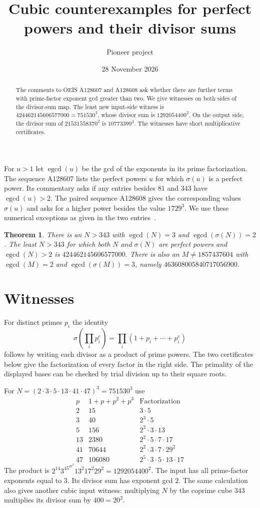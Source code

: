 \documentclass[11pt]{article}
\title{Cubic counterexamples for perfect powers and their divisor sums}
\author{Pioneer project}
\date{28 November 2026}
\newtheorem{theorem}{Theorem}
\newcommand{\egcd}{\operatorname{egcd}}
\begin{document}
\maketitle

\begin{abstract}
The comments to OEIS A128607 and A128608 ask whether there are further
terms with prime-factor exponent gcd greater than two. We give witnesses
on both sides of the divisor-sum map. The least new input-side witness is
$424462145606577000=751530^3$, whose divisor sum is $1292054400^2$.
On the output side, the divisor sum of $21531558370^2$ is
$10773399^3$. The witnesses have short multiplicative certificates.
\end{abstract}

For $u>1$ let $\egcd(u)$ be the gcd of the exponents in its prime
factorization. The sequence A128607 lists the perfect powers $u$ for which
$\sigma(u)$ is a perfect power. Its commentary asks if any entries besides
$81$ and $343$ have $\egcd(u)>2$. The paired sequence A128608 gives the
corresponding values $\sigma(u)$ and asks for a higher power besides the
value $1729^3$. We use these numerical exceptions as given in the two
entries~\cite{oeis607,oeis608}.

\begin{theorem}
There is an $N>343$ with $\egcd(N)=3$ and $\egcd(\sigma(N))=2$.
The least $N>343$ for which both $N$ and $\sigma(N)$ are perfect powers
and $\egcd(N)>2$ is $424462145606577000$.
There is also an $M\ne 1857437604$ with $\egcd(M)=2$ and
$\egcd(\sigma(M))=3$, namely $463608005840717056900$.
\end{theorem}

\section{Witnesses}

For distinct primes $p_i$ the identity
\[
 \sigma\left(\prod_i p_i^e\right)=
 \prod_i (1+p_i+\cdots+p_i^e)
\]
follows by writing each divisor as a product of prime powers. The two
certificates below give the factorization of every factor in the right
side. The primality of the displayed bases can be checked by trial division
up to their square roots.

For $N=(2\cdot 3\cdot 5\cdot 13\cdot 41\cdot 47)^3=751530^3$ use
\[
\begin{array}{r|r|l}
p & 1+p+p^2+p^3 & \text{Factorization}\\ \hline
2 & 15 & 3\cdot5\\
3 & 40 & 2^3\cdot5\\
5 & 156 & 2^2\cdot3\cdot13\\
13 & 2380 & 2^2\cdot5\cdot7\cdot17\\
41 & 70644 & 2^2\cdot3\cdot7\cdot29^2\\
47 & 106080 & 2^5\cdot3\cdot5\cdot13\cdot17
\end{array}
\]
The product is
$2^{14}3^45^47^2 13^2 17^2 29^2=1292054400^2$. The input has all
prime-factor exponents equal to $3$. Its divisor sum has exponent gcd
$2$. The same calculation also gives another cubic input witness:
multiplying $N$ by the coprime cube $343$ multiplies its divisor sum by
$400=20^2$.
\end{document}
